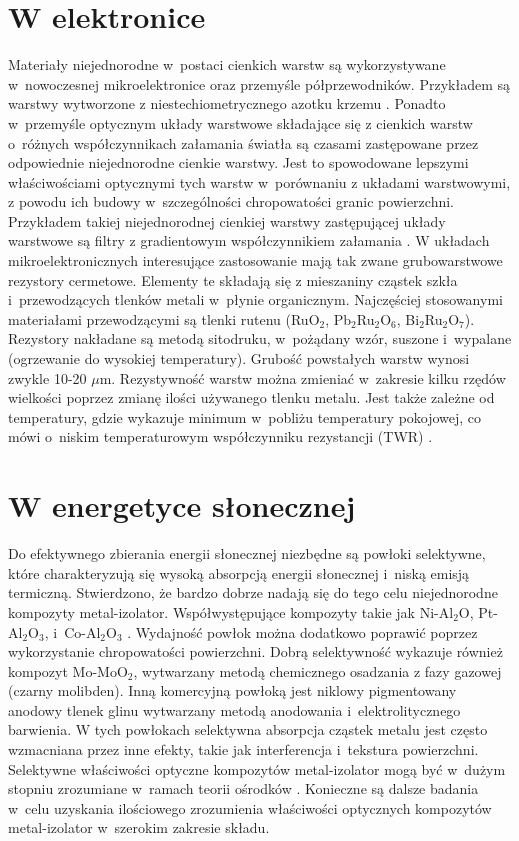 \section{W elektronice}
\indent Materiały niejednorodne w~postaci cienkich warstw są wykorzystywane w~nowoczesnej mikroelektronice oraz przemyśle półprzewodników. Przykładem są warstwy wytworzone z niestechiometrycznego azotku krzemu \cite{debieu2013structural}. Ponadto w~przemyśle optycznym układy warstwowe składające się z cienkich warstw o~różnych współczynnikach załamania światła są czasami zastępowane przez odpowiednie niejednorodne cienkie warstwy. Jest to spowodowane lepszymi właściwościami optycznymi tych warstw w~porównaniu z układami warstwowymi, z powodu ich budowy w~szczególności chropowatości granic powierzchni. Przykładem takiej niejednorodnej cienkiej warstwy zastępującej układy warstwowe są filtry z gradientowym współczynnikiem załamania \cite{bovard1990rugate}. W układach mikroelektronicznych interesujące zastosowanie mają tak zwane grubowarstwowe rezystory cermetowe. Elementy te składają się z mieszaniny cząstek szkła i~przewodzących tlenków metali w~płynie organicznym. Najczęściej stosowanymi materiałami przewodzącymi są tlenki rutenu (RuO$_2$, Pb$_2$Ru$_2$O$_6$, Bi$_2$Ru$_2$O$_7$). Rezystory nakładane są metodą sitodruku, w~pożądany wzór, suszone i~wypalane (ogrzewanie do wysokiej temperatury). Grubość powstałych warstw wynosi zwykle 10-20 $\mu$m. Re\-zy\-sty\-wność warstw można zmieniać w~zakresie kilku rzędów wielkości poprzez zmianę ilości używanego tlenku metalu. Jest także zależne od temperatury, gdzie wykazuje minimum w~pobliżu temperatury pokojowej, co mówi o~niskim temperaturowym współczynniku rezystancji (TWR) \cite{kusy1976structure}.

\section{W energetyce słonecznej}
\indent Do efektywnego zbierania energii słonecznej niezbędne są powłoki selektywne, które charakteryzują się wysoką absorpcją energii słonecznej i~niską emisją termiczną. Stwierdzono, że bardzo dobrze nadają się do tego celu niejednorodne kompozyty metal-izolator. Współwystępujące kompozyty takie jak Ni-Al$_{2}$O, Pt-Al$_{2}$O$_{3}$, i~Co-Al$_{2}$O$_{3}$ \cite{niklasson1985noble}. Wydajność powłok można dodatkowo poprawić poprzez wykorzystanie chropowatości powierzchni. Dobrą selektywność wykazuje również kompozyt Mo-MoO$_{2}$, wytwarzany metodą chemicznego osadzania z fazy gazowej (czarny molibden). Inną komercyjną powłoką jest niklowy pigmentowany anodowy tlenek glinu wytwarzany metodą anodowania i~elektrolitycznego barwienia. W tych powłokach selektywna ab\-sor\-pcja cząstek metalu jest często wzmacniana przez inne efekty, takie jak interferencja i~tekstura powierzchni. Selektywne właściwości optyczne kompozytów metal-izolator mogą być w~dużym stopniu zrozumiane w~ramach teorii ośrodków \cite{smith1985surface}. Konieczne są dalsze badania w~celu uzyskania ilościowego zrozumienia właściwości optycznych kompozytów metal-izolator w~szerokim zakresie składu.

